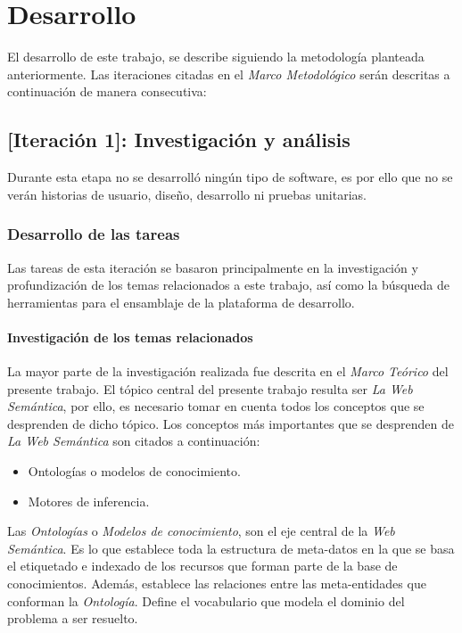 \chapter{Desarrollo}
\label{chap:desarrollo}

El desarrollo de este trabajo, se describe siguiendo la metodología planteada anteriormente. Las iteraciones citadas en el \textit{Marco Metodológico} serán descritas a continuación de manera consecutiva:

\section{[Iteración 1]: Investigación y análisis}
Durante esta etapa no se desarrolló ningún tipo de software, es por ello que no se verán historias de usuario, diseño, desarrollo ni pruebas unitarias.

\subsection{Desarrollo de las tareas}
Las tareas de esta iteración se basaron principalmente en la investigación y profundización de los temas relacionados a este trabajo, así como la búsqueda de herramientas para el ensamblaje de la plataforma de desarrollo.

\subsubsection{Investigación de los temas relacionados}
La mayor parte de la investigación realizada fue descrita en el \textit{Marco Teórico} del presente trabajo. El tópico central del presente trabajo resulta ser \textit{La Web Semántica}, por ello, es necesario tomar en cuenta todos los conceptos que se desprenden de dicho tópico. Los conceptos más importantes que se desprenden de \textit{La Web Semántica} son citados a continuación:

\begin{itemize}
\item Ontologías o modelos de conocimiento.
\item Motores de inferencia.
\end{itemize}

Las \textit{Ontologías} o \textit{Modelos de conocimiento}, son el eje central de la \textit{Web Semántica}. Es lo que establece toda la estructura de meta-datos en la que se basa el etiquetado e indexado de los recursos que forman parte de la base de conocimientos. Además, establece las relaciones entre las meta-entidades que conforman la \textit{Ontología}. Define el vocabulario que modela el dominio del problema a ser resuelto.

